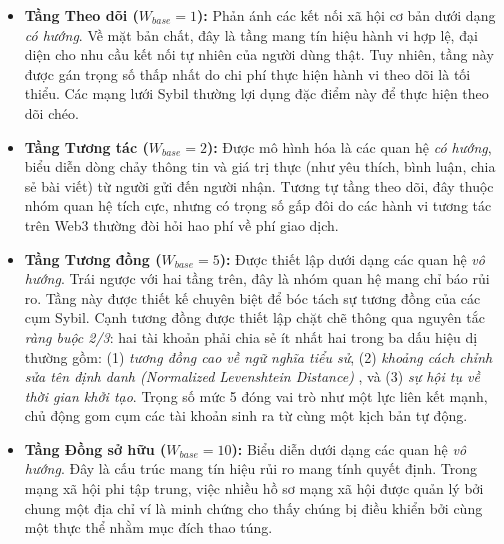 \begin{itemize}[label={--}, itemsep=3pt]
    \item \textbf{Tầng Theo dõi ($W_{base} = 1$):} Phản ánh các kết nối xã hội cơ bản dưới dạng \textit{có hướng}. Về mặt bản chất, đây là tầng mang tín hiệu hành vi hợp lệ, đại diện cho nhu cầu kết nối tự nhiên của người dùng thật. Tuy nhiên, tầng này được gán trọng số thấp nhất do chi phí thực hiện hành vi theo dõi là tối thiểu. Các mạng lưới Sybil thường lợi dụng đặc điểm này để thực hiện theo dõi chéo.
    
    \item \textbf{Tầng Tương tác ($W_{base} = 2$):} Được mô hình hóa là các quan hệ \textit{có hướng}, biểu diễn dòng chảy thông tin và giá trị thực (như yêu thích, bình luận, chia sẻ bài viết) từ người gửi đến người nhận. Tương tự tầng theo dõi, đây thuộc nhóm quan hệ tích cực, nhưng có trọng số gấp đôi do các hành vi tương tác trên Web3 thường đòi hỏi hao phí về phí giao dịch.

    \item \textbf{Tầng Tương đồng ($W_{base} = 5$):} Được thiết lập dưới dạng các quan hệ \textit{vô hướng}. Trái ngược với hai tầng trên, đây là nhóm quan hệ mang chỉ báo rủi ro. Tầng này được thiết kế chuyên biệt để bóc tách sự tương đồng của các cụm Sybil. Cạnh tương đồng được thiết lập chặt chẽ thông qua nguyên tắc \textit{ràng buộc 2/3}: hai tài khoản phải chia sẻ ít nhất hai trong ba dấu hiệu dị thường gồm: (1) \textit{tương đồng cao về ngữ nghĩa tiểu sử}, (2) \textit{khoảng cách chỉnh sửa tên định danh (Normalized Levenshtein Distance)} \cite{yujian2007normalized}, và (3) \textit{sự hội tụ về thời gian khởi tạo}. Trọng số mức 5 đóng vai trò như một lực liên kết mạnh, chủ động gom cụm các tài khoản sinh ra từ cùng một kịch bản tự động.
    
    \item \textbf{Tầng Đồng sở hữu ($W_{base} = 10$):} Biểu diễn dưới dạng các quan hệ \textit{vô hướng}. Đây là cấu trúc mang tín hiệu rủi ro mang tính quyết định. Trong mạng xã hội phi tập trung, việc nhiều hồ sơ mạng xã hội được quản lý bởi chung một địa chỉ ví là minh chứng cho thấy chúng bị điều khiển bởi cùng một thực thể nhằm mục đích thao túng.
\end{itemize}